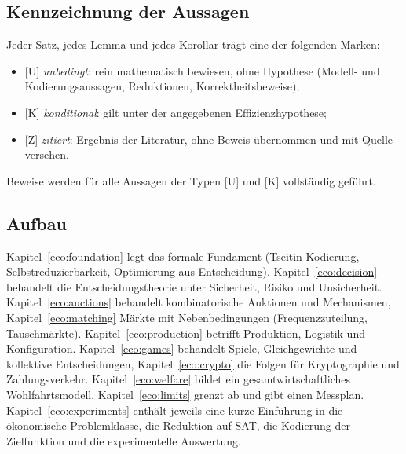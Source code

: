 \documentclass[a4paper,12pt]{article}
\theoremstyle{definition}
\newcommand{\tU}{\textsf{\small[U]}}   %
\newcommand{\tK}{\textsf{\small[K]}}   %
\newcommand{\tZ}{\textsf{\small[Z]}}   %
\begin{document}
\subsection{Kennzeichnung der Aussagen}
Jeder Satz, jedes Lemma und jedes Korollar trägt eine der folgenden Marken:
\begin{itemize}
  \item \tU{} \emph{unbedingt}: rein mathematisch bewiesen, ohne Hypothese (Modell- und Kodierungsaussagen, Reduktionen, Korrektheitsbeweise);
  \item \tK{} \emph{konditional}: gilt unter der angegebenen Effizienzhypothese;
  \item \tZ{} \emph{zitiert}: Ergebnis der Literatur, ohne Beweis übernommen und mit Quelle versehen.
\end{itemize}
Beweise werden für alle Aussagen der Typen \tU{} und \tK{} vollständig geführt.

\subsection{Aufbau}
Kapitel~\ref{eco:foundation} legt das formale Fundament (Tseitin-Kodierung, Selbstreduzierbarkeit, Optimierung aus Entscheidung). Kapitel~\ref{eco:decision} behandelt die Entscheidungstheorie unter Sicherheit, Risiko und Unsicherheit. Kapitel~\ref{eco:auctions} behandelt kombinatorische Auktionen und Mechanismen, Kapitel~\ref{eco:matching} Märkte mit Nebenbedingungen (Frequenzzuteilung, Tauschmärkte). Kapitel~\ref{eco:production} betrifft Produktion, Logistik und Konfiguration. Kapitel~\ref{eco:games} behandelt Spiele, Gleichgewichte und kollektive Entscheidungen, Kapitel~\ref{eco:crypto} die Folgen für Kryptographie und Zahlungsverkehr. Kapitel~\ref{eco:welfare} bildet ein gesamtwirtschaftliches Wohlfahrtsmodell, Kapitel~\ref{eco:limits} grenzt ab und gibt einen Messplan.
Kapitel~\ref{eco:experiments} enthält jeweils eine kurze Einführung in die ökonomische Problemklasse, die Reduktion auf SAT, die Kodierung der Zielfunktion und die experimentelle Auswertung.
\end{document}
